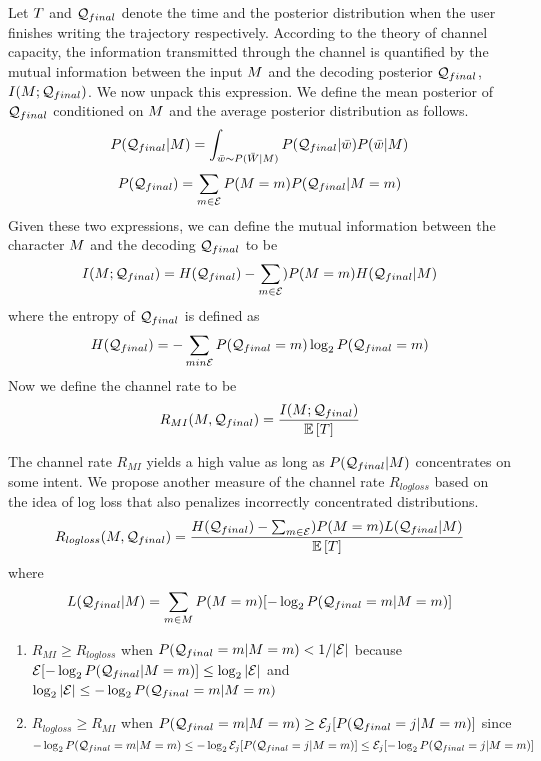\documentclass{sigchi}
\begin{document}
Let $T$ and $\mathcal{Q}_{final}$ denote the time and the posterior
distribution when the user finishes writing the trajectory respectively.
According to the theory of channel capacity, the information
transmitted through the channel is quantified by the mutual information between the
input $M$ and the decoding posterior $\mathcal{Q}_{final}$, $I(M ;
\mathcal{Q}_{final})$. We now unpack this expression.  We define the mean
posterior of $\mathcal{Q}_{final}$ conditioned on $M$ and the average
posterior distribution as follows.
\[
P(\mathcal{Q}_{final} | M)=
\int_{\bar{w} \sim P(\bar{W} | M)} { P(\mathcal{Q}_{final} | \bar{w})
P(\bar{w} | M)} 
\]
\[
P(\mathcal{Q}_{final})
=
\sum_{m \in \mathcal{E}} 
P(M = m) P(\mathcal{Q}_{final} | M = m)
\]
Given these two expressions, we can define the mutual information
between the character $M$ and the decoding $\mathcal{Q}_{final}$ to be 
\[
I(M ; \mathcal{Q}_{final}) = H(\mathcal{Q}_{final}) - \sum_{m \in \mathcal{E}})
P(M = m) H(\mathcal{Q}_{final} | M)
\]
where the entropy of $\mathcal{Q}_{final}$ is defined as
\[
H(\mathcal{Q}_{final}) = -\sum_{m in \mathcal{E}} {
P(\mathcal{Q}_{final} = m) \log_2 P(\mathcal{Q}_{final} = m)}
\]
Now we define the channel rate to be 
\begin{align}
\label{eq:channel_rate}
R_{MI}(M, \mathcal{Q}_{final}) 
= 
\frac{I( M ;  \mathcal{Q}_{final})}{\mathbb{E} \left[T\right]}
\end{align}

The channel rate $R_{MI}$ yields a high value as long as $P(\mathcal{Q}_{final} |
M)$ concentrates on some intent. We propose another measure of
the channel rate $R_{logloss}$ based on the idea of log loss that
also penalizes incorrectly concentrated distributions.
\[
R_{logloss}(M, \mathcal{Q}_{final})
=
\frac{H(\mathcal{Q}_{final}) - \sum_{m \in \mathcal{E}})
P(M = m) L(\mathcal{Q}_{final} | M)}{\mathbb{E} \left[T\right]}
\]
where
\[
L(\mathcal{Q}_{final} | M) 
=  
\sum_{m \in M} P(M = m) [ - \log_2 P(\mathcal{Q}_{final} = m |
M = m) ]
\]

\begin{enumerate}
\item $R_{MI} \ge R_{logloss}$ when $P(\mathcal{Q}_{final} = m | M =m) < 1/|\mathcal{E}|$ 
because $\mathcal{E}[-\log_2 P(\mathcal{Q}_{final} | M = m)] \le \log_2
|\mathcal{E}|$ and $\log_2 |\mathcal{E}| \le -\log_2 P(\mathcal{Q}_{final} = m |
M = m)$\\
\item $R_{logloss} \ge R_{MI}$ when $P(\mathcal{Q}_{final} = m | M =m)
  \ge \mathcal{E}_j[P(\mathcal{Q}_{final} = j | M = m)]$ since $-\log_2
  P(\mathcal{Q}_{final} = m | M =m) \le -\log_2
  \mathcal{E}_j[P(\mathcal{Q}_{final} = j | M = m)] \le \mathcal{E}_j[
  -\log_2 P(\mathcal{Q}_{final} = j | M = m)]$ 
\end{enumerate}
\end{document}
